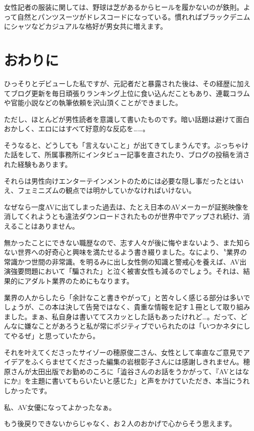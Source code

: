 \documentclass[12pt,UTF8]{ctexbook}
\begin{document}
女性記者の服装に関しては、野球は芝があるからヒールを履かないのが鉄則。よって自然とパンツスーツがドレスコードになっている。慣れればブラックデニムにシャツなどカジュアルな格好が男女共に増えます。

\section{おわりに}

ひっそりとデビューした私ですが、元記者だと暴露された後は、その経歴に加えてブログ更新を毎日頑張りランキング上位に食い込んだこともあり、連載コラムや官能小説などの執筆依頼を沢山頂くことができました。

ただし、ほとんどが男性読者を意識して書いたものです。暗い話題は避けて面白おかしく、エロにはすべて好意的な反応を……。

そうなると、どうしても「言えないこと」が出てきてしまうんです。ぶっちゃけた話をして、所属事務所にインタビュー記事を直されたり、ブログの投稿を消された経験もあります。

それらは男性向けエンターテインメントのためには必要な隠し事だったとはいえ、フェミニズムの観点では明かしていかなければいけない。

なぜなら一度AVに出てしまった過去は、たとえ日本のAVメーカーが証拠映像を消してくれようとも違法ダウンロードされたものが世界中でアップされ続け、消えることはありません。

無かったことにできない職歴なので、志す人々が後に悔やまないよう、また知らない世界への好奇心と興味を満たせるよう書き綴りました。なにより、〝業界の常識かつ世間の非常識〟を明るみに出し女性側の知識と警戒心を養えば、AV出演強要問題において「騙された」と泣く被害女性も減るのでしょう。それは、結果的にアダルト業界のためにもなります。

業界の人からしたら「余計なこと書きやがって」と苦々しく感じる部分は多いでしょうが、この本は決して告発ではなく、貴重な情報を記す１冊として取り組みました。まぁ、私自身は書いててスカッとした話もあったけれど…。だって、どんなに嫌なことがあろうと私が常にポジティブでいられたのは「いつかネタにしてやるぜ」と思っていたから。

それを叶えてくださったサイゾーの穂原俊二さん、女性として率直なご意見でアイデアをふくらませてくださった編集の岩根彰子さんには感謝しきれません。穂原さんが太田出版でお勤めのころに「澁谷さんのお話をうかがって、『AVとはなにか』を主題に書いてもらいたいと感じた」と声をかけていただき、本当にうれしかったです。

私、AV女優になってよかったなぁ。

もう後戻りできないからじゃなく、お２人のおかげで心からそう思えます。
\end{document}
